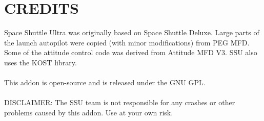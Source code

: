 \documentclass[13pt]{article}
\begin{document}
\newpage

\newpage

\newpage

\newpage


\newpage
\section{CREDITS}
Space Shuttle Ultra was originally based on Space Shuttle Deluxe. Large parts of the launch autopilot were copied (with minor modifications) from PEG MFD.
Some of the attitude control code was derived from Attitude MFD V3.
SSU also uses the KOST library. \\
\\
This addon is open-source and is released under the GNU GPL. \\
\\
DISCLAIMER: The SSU team is not responsible for any crashes or other problems caused by this addon. Use at your own risk.
\end{document}
